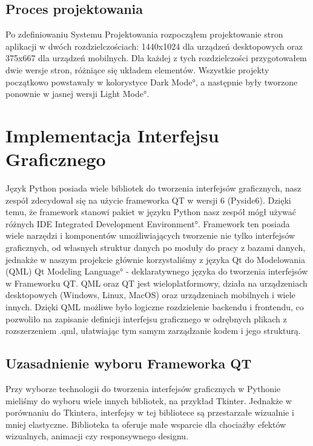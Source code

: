 
\subsection{Proces projektowania}
\label{sec:ProcesProjektowania}
Po zdefiniowaniu Systemu Projektowania rozpocząłem projektowanie stron aplikacji w dwóch rozdzielczościach: 1440x1024 dla urządzeń desktopowych oraz 375x667 dla urządzeń mobilnych. Dla każdej z tych rozdzielczości przygotowałem dwie wersje stron, różniące się układem elementów. Wszystkie projekty początkowo powstawały w kolorystyce \ang{Dark Mode}, a następnie były tworzone ponownie w jasnej wersji \ang{Light Mode}.


\section{Implementacja Interfejsu Graficznego}
\label{sec:ImplementacjaInterfejsuGraficznego}
Język Python posiada wiele bibliotek do tworzenia interfejsów graficznych, nasz zespół zdecydował się na użycie frameworka QT w wersji 6 (Pyside6). Dzięki temu, że framework stanowi pakiet w języku Python nasz zespół mógł używać różnych IDE \ang{Integrated Development Environment}.
Framework ten posiada wiele narzędzi i komponentów umożliwiających tworzenie nie tylko interfejsów graficznych, od własnych struktur danych po moduły do pracy z bazami danych, jednakże w naszym projekcie głównie korzystaliśmy z języka Qt do Modelowania (QML) \ang{Qt Modeling Language} - deklaratywnego języka do tworzenia interfejsów w Frameworku QT. QML oraz QT jest wieloplatformowy, działa na urządzeniach desktopowych (Windows, Linux, MacOS) oraz urządzeniach mobilnych i wiele innych.
Dzięki QML możliwe było logiczne rozdzielenie backendu i frontendu, co pozwoliło na zapisanie definicji interfejsu graficznego w odrębnych plikach z rozszerzeniem .qml, ułatwiając tym samym zarządzanie kodem i jego strukturą.

\subsection{Uzasadnienie wyboru Frameworka QT}
\label{sec:UzasadnienieWyboruFrameworkaQT}
Przy wyborze technologii do tworzenia interfejsów graficznych w Pythonie mieliśmy do wyboru wiele innych bibliotek, na przykład Tkinter. 
Jednakże w porównaniu do Tkintera, interfejsy w tej bibliotece są przestarzałe wizualnie i mniej elastyczne. Biblioteka ta oferuje małe wsparcie dla chociażby efektów wizualnych, animacji czy responsywnego designu.

